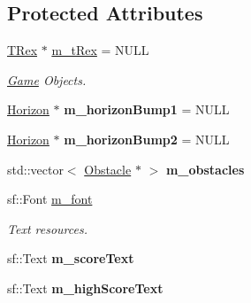 \subsection*{Protected Attributes}
\begin{DoxyCompactItemize}
\item 
\mbox{\label{class_game_a942d3d229fe732cf76cb19dcd833e48e}} 
\mbox{\hyperlink{class_t_rex}{T\+Rex}} $\ast$ \mbox{\hyperlink{class_game_a942d3d229fe732cf76cb19dcd833e48e}{m\+\_\+t\+Rex}} = N\+U\+LL
\begin{DoxyCompactList}\small\item\em \mbox{\hyperlink{class_game}{Game}} Objects. \end{DoxyCompactList}\item 
\mbox{\label{class_game_a27c5e7248e0f35a7174060fe486813b9}} 
\mbox{\hyperlink{class_horizon}{Horizon}} $\ast$ {\bfseries m\+\_\+horizon\+Bump1} = N\+U\+LL
\item 
\mbox{\label{class_game_ae6b47fcd9434115b3efab51e38069fb6}} 
\mbox{\hyperlink{class_horizon}{Horizon}} $\ast$ {\bfseries m\+\_\+horizon\+Bump2} = N\+U\+LL
\item 
\mbox{\label{class_game_afddd7ab41effad328b842bbd94ccaa04}} 
std\+::vector$<$ \mbox{\hyperlink{class_obstacle}{Obstacle}} $\ast$ $>$ {\bfseries m\+\_\+obstacles}
\item 
\mbox{\label{class_game_af5c5c39d0eabe68c3bfff3509900a489}} 
sf\+::\+Font \mbox{\hyperlink{class_game_af5c5c39d0eabe68c3bfff3509900a489}{m\+\_\+font}}
\begin{DoxyCompactList}\small\item\em Text resources. \end{DoxyCompactList}\item 
\mbox{\label{class_game_ad5bdaeb5c0db926cafb70b62e71f08e2}} 
sf\+::\+Text {\bfseries m\+\_\+score\+Text}
\item 
\mbox{\label{class_game_ab9020bc8d30c2c0e74ae866c887efbc1}} 
sf\+::\+Text {\bfseries m\+\_\+high\+Score\+Text}
\item 
\mbox{\label{class_game_ae19995640862da4362d620dc5829e501}} 

\end{DoxyCompactItemize}
